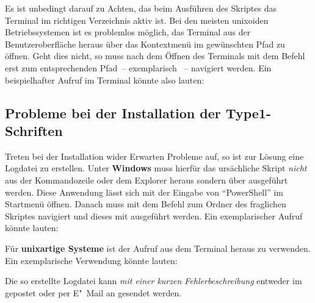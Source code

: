 Es ist unbedingt darauf zu Achten, das beim Ausführen des Skriptes das Terminal 
im richtigen Verzeichnis aktiv ist. Bei den meisten unixoiden Betriebssystemen 
ist es problemlos möglich, das Terminal aus der Benutzeroberfläche heraus über 
das Kontextmenü im gewünschten Pfad zu öffnen. Geht dies nicht, so muss nach 
dem Öffnen des Terminals mit dem Befehl  erst zum entsprechenden 
Pfad~-- exemplarisch ~-- 
navigiert werden. Ein beispielhafter Aufruf im Terminal könnte also lauten:
%
\begin{quoting}
\RET*%
\RET%
\end{quoting}



\subsection{Probleme bei der Installation der Type1-Schriften}

Treten bei der Installation wider Erwarten Probleme auf, so ist zur Lösung eine 
Logdatei zu erstellen. Unter \textbf{Windows} muss hierfür das ursächliche 
Skript \emph{nicht} aus der Kommandozeile oder dem Explorer heraus sondern über 
 ausgeführt werden. Diese Anwendung lässt sich 
mit der Eingabe von \enquote{PowerShell} im Startmenü öffnen. Danach muss mit 
dem Befehl  zum Ordner des fraglichen Skriptes navigiert und dieses 
mit  
ausgeführt werden. Ein exemplarischer Aufruf könnte lauten:
%
\begin{quoting}
\RET*%
\RET%
\end{quoting}
%
Für \textbf{unixartige Systeme} ist der Aufruf 
 aus dem Terminal heraus zu 
verwenden. Ein exemplarische Verwendung könnte lauten:
%
\begin{quoting}
\RET*%
\RET%
\end{quoting}
%
Die so erstellte Logdatei kann \emph{mit einer kurzen Fehlerbeschreibung} 
entweder im \GitHubRepo gepostet oder per E"~Mail an \mailto{\TUDScriptContact}
gesendet werden.



